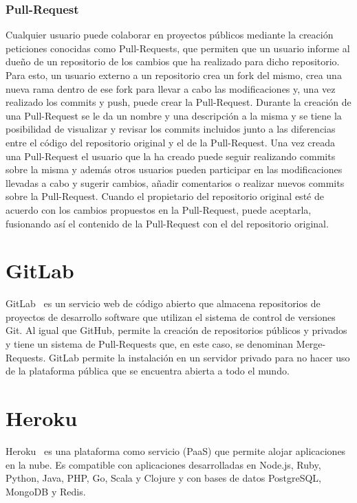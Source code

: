 \documentclass[a4paper, 12pt]{book}
\begin{document}
\subsubsection{Pull-Request}
Cualquier usuario puede colaborar en proyectos públicos mediante la creación peticiones conocidas como Pull-Requests, que permiten que un usuario informe al dueño de un repositorio de los cambios que ha realizado para dicho repositorio.
Para esto, un usuario externo a un repositorio crea un fork del mismo, crea una nueva rama dentro de ese fork para llevar a cabo las modificaciones y, una vez realizado los commits y push, puede crear la Pull-Request.
Durante la creación de una Pull-Request se le da un nombre y una descripción a la misma y se tiene la posibilidad de visualizar y revisar los commits incluidos junto a las diferencias entre el código del repositorio original y el de la Pull-Request.
Una vez creada una Pull-Request el usuario que la ha creado puede seguir realizando commits sobre la misma y además otros usuarios pueden participar en las modificaciones llevadas a cabo y sugerir cambios, añadir comentarios o realizar nuevos commits sobre la Pull-Request.
Cuando el propietario del repositorio original esté de acuerdo con los cambios propuestos en la Pull-Request, puede aceptarla, fusionando así el contenido de la Pull-Request con el del repositorio original.

\section{GitLab} 
\label{sec:gitlab}

GitLab~\cite{gitlab} es un servicio web de código abierto que almacena repositorios de proyectos de desarrollo software que utilizan el sistema de control de versiones Git. Al igual que GitHub, permite la creación de repositorios públicos y privados y tiene un sistema de Pull-Requests que, en este caso, se denominan Merge-Requests.
GitLab permite la instalación en un servidor privado para no hacer uso de la plataforma pública que se encuentra abierta a todo el mundo.

\section{Heroku} 
\label{sec:Heroku}

Heroku~\cite{heroku} es una plataforma como servicio (PaaS) que permite alojar aplicaciones en la nube. Es compatible con aplicaciones desarrolladas en Node.js, Ruby, Python, Java, PHP, Go, Scala y Clojure y con bases de datos PostgreSQL, MongoDB y Redis.
\end{document}
